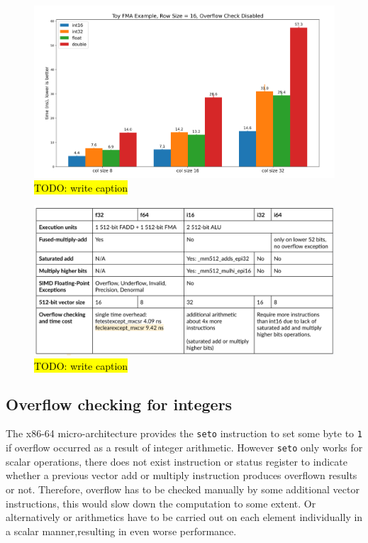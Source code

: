\documentclass[logo,bsc,singlespacing,parskip]{infthesis}
\begin{document}
\begin{figure}[H]
    \includegraphics[width=\linewidth]{image/col8-col16-col32-i16-i32-f32-f64.png}
    \caption{\hl{TODO: write caption}}
    \label{fig:col8-col16-col32-i16-i32-f32-f64}
\end{figure}

\begin{figure}[H]\captionsetup{name=}
    \includegraphics[width=\linewidth]{image/arch-table.png}
    \caption{\hl{TODO: write caption}}
    \label{archtable}
\end{figure}

\subsection{Overflow checking for integers}

The x86-64 micro-architecture provides the \texttt{seto} instruction to set some
byte to \texttt{1} if overflow occurred as a result of integer arithmetic.
However \texttt{seto} only works for scalar operations, there does not exist
instruction or status register to indicate whether a previous vector add or
multiply instruction produces overflown results or not. Therefore, overflow has
to be checked manually by some additional vector instructions, this would slow
down the computation to some extent. Or alternatively or arithmetics have to be
carried out on each element individually in a scalar manner,resulting in even
worse performance. 
\end{document}
